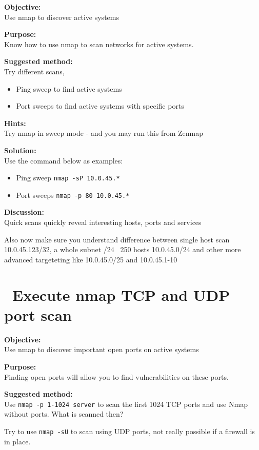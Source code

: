 \documentclass[a4paper,11pt,notitlepage]{report}
\begin{document}
{\bf Objective:}\\
Use nmap to discover active systems

{\bf Purpose:}\\
Know how to use nmap to scan networks for active systems.

{\bf Suggested method:}\\
Try different scans,
\begin{itemize}
\item Ping sweep to find active systems
\item Port sweeps to find active systems with specific ports
\end{itemize}

{\bf Hints:} \\
Try nmap in sweep mode - and you may run this from Zenmap

{\bf Solution:}\\
Use the command below as examples:
\begin{itemize}
\item Ping sweep \verb+nmap -sP 10.0.45.*+
\item Port sweeps \verb+nmap -p 80 10.0.45.*+
\end{itemize}

{\bf Discussion:}\\
Quick scans quickly reveal interesting hosts, ports and services

Also now make sure you understand difference between single host scan
10.0.45.123/32, a whole subnet /24 ~250 hosts 10.0.45.0/24 and other more advanced targeteting like 10.0.45.0/25 and 10.0.45.1-10

\chapter{\faInfoCircle\ Execute nmap TCP and UDP port scan}
\label{ex:nmap-synscan}


{\bf Objective:} \\
Use nmap to discover important open ports on active systems

{\bf Purpose:}\\
Finding open ports will allow you to find vulnerabilities on these ports.

{\bf Suggested method:}\\
Use \verb+nmap -p 1-1024 server+ to scan the first 1024 TCP
ports and use Nmap without ports. What is scanned then?

Try to use \verb+nmap -sU+ to scan using UDP ports, not really possible if a firewall is in place.
\end{document}
